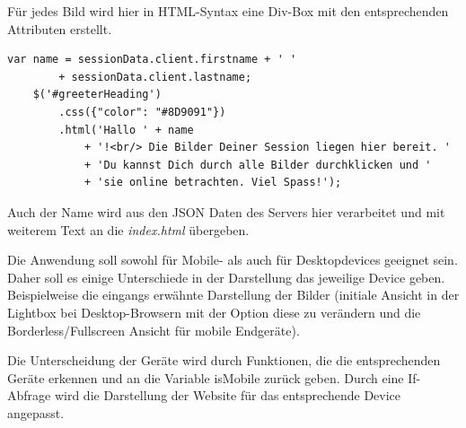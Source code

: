 Für jedes Bild wird hier in HTML-Syntax eine Div-Box mit den entsprechenden Attributen erstellt. 

	\begin{lstlisting}[caption={Auszug aus app.js (Webclient)}, label=list_client]
	var name = sessionData.client.firstname + ' ' 
		+ sessionData.client.lastname;
	$('#greeterHeading')
		.css({"color": "#8D9091"})
		.html('Hallo ' + name 
			+ '!<br/> Die Bilder Deiner Session liegen hier bereit. ' 
			+ 'Du kannst Dich durch alle Bilder durchklicken und '
			+ 'sie online betrachten. Viel Spass!');
	\end{lstlisting}


Auch der Name wird aus den JSON Daten des Servers hier verarbeitet und mit weiterem Text an die \textit{index.html} übergeben. 

Die Anwendung soll sowohl für Mobile- als auch für Desktopdevices geeignet sein. Daher soll es einige Unterschiede in der Darstellung das jeweilige Device geben. Beispielweise die eingangs erwähnte Darstellung der Bilder (initiale Ansicht in der Lightbox bei Desktop-Browsern mit der Option diese zu verändern und die Borderless/Fullscreen Ansicht für mobile Endgeräte). 

Die Unterscheidung der Geräte wird durch Funktionen, die die entsprechenden Geräte erkennen und an die Variable isMobile zurück geben. Durch eine If-Abfrage wird die Darstellung der Website für das entsprechende Device angepasst.

